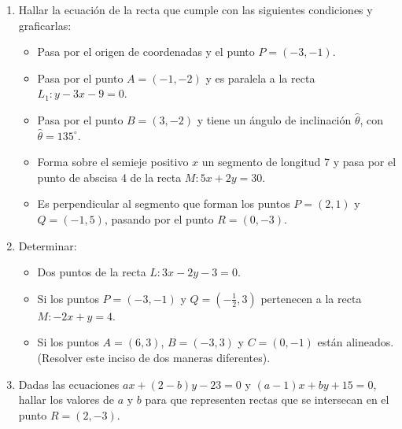 \documentclass[11pt]{article}
\begin{document}
\begin{enumerate}[\hspace{-7mm}$1)$]
\begin{enumerate}[a) ]
\begin{minipage}{.45\textwidth}
\end{minipage}


\end{enumerate}






\item  Hallar la ecuación de la recta que cumple con las siguientes condiciones y graficarlas:

\begin{itemize}
    \item[(a)] Pasa por el origen de coordenadas y el punto $P = (-3,-1)$.
    \item[(b)] Pasa por el punto $A = (-1,-2)$ y es paralela a la recta $L_1 : y - 3x - 9 = 0$.
    \item[(c)] Pasa por el punto $B = (3,-2)$ y tiene un ángulo de inclinación $\hat{\theta}$, con $\hat{\theta} = 135^\circ$.
    \item[(d)] Forma sobre el semieje positivo $x$ un segmento de longitud 7 y pasa por el punto de abscisa 4 de la recta $M : 5x + 2y = 30$.
    \item[(e)] Es perpendicular al segmento que forman los puntos $P = (2,1)$ y $Q = (-1,5)$, pasando por el punto $R = (0,-3)$.
\end{itemize}












\item  Determinar:

\begin{itemize}
    \item[(a)] Dos puntos de la recta $L : 3x - 2y - 3 = 0$.
    \item[(b)] Si los puntos $P = (-3,-1)$ y $Q = \left(-\frac{1}{2}, 3\right)$ pertenecen a la recta $M : -2x + y = 4$.
    \item[(c)] Si los puntos $A = (6,3)$, $B = (-3,3)$ y $C = (0,-1)$ están alineados. (Resolver este inciso de dos maneras diferentes).
\end{itemize}










\item  Dadas las ecuaciones $ax + (2 - b)y - 23 = 0$ y $(a - 1)x + by + 15 = 0$, hallar los valores de $a$ y $b$ para que representen rectas que se intersecan en el punto $R = (2,-3)$.



\end{enumerate}
\end{document}
